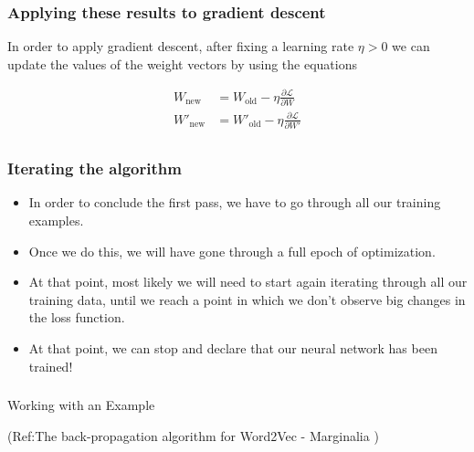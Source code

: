 \begin{frame}[fragile]\frametitle{Applying these results to gradient descent}

 In order to apply gradient descent, after fixing a learning rate 
$\eta>0$
 we can update the values of the weight vectors by using the equations
 
 \begin{eqnarray}
W_{\textrm{new}} & = W_{\textrm{old}} - \eta \frac{\partial \mathcal{L}}{\partial W} \nonumber \\
W'_{\textrm{new}} & = W'_{\textrm{old}} - \eta \frac{\partial \mathcal{L}}{\partial W'} \nonumber \\
\end{eqnarray}

\end{frame}


\begin{frame}[fragile]\frametitle{Iterating the algorithm}

  \begin{itemize}
    \item In order to conclude the first pass, we have to go through all our training examples. 
	\item Once we do this, we will have gone through a full epoch of optimization. 
	\item At that point, most likely we will need to start again iterating through all our training data, until we reach a point in which we don’t observe big changes in the loss function. 
	\item At that point, we can stop and declare that our neural network has been trained!
	  \end{itemize}

\end{frame}






\begin{frame}[fragile]\frametitle{}

\begin{center}
{\Large Working with an Example}

{\tiny (Ref:The back-propagation algorithm for Word2Vec - Marginalia )}

\end{center}

\end{frame}

